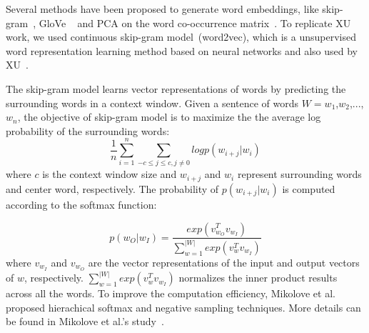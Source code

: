 \documentclass[sigconf]{acmart}
\theoremstyle{break}
\begin{document}
Several methods have been proposed to generate word embeddings, 
like skip-gram~\cite{mikolov2013distributed}, GloVe ~\cite{pennington2014glove}
and PCA on the word co-occurrence matrix~\cite{lebret2013word}. To replicate XU work,
we used continuous skip-gram model~(word2vec),  which is a unsupervised word representation learning method based on
neural networks and also used by  XU~\cite{xu2016predicting}. 

The skip-gram model learns vector representations of words
 by predicting the surrounding words in a context window. 
 Given a sentence of words $W =w_1$,$w_2$,...,$w_n$, the objective of skip-gram model is to maximize the
 the average log probability of the surrounding words:
 \begin{equation*}
 \frac{1}{n}\sum_{i=1}^{n} \sum_{-c\leq j \leq c, j \neq 0} log p(w_{i+j}|w_i)
\end{equation*}
where $c$ is the context window size and $w_{i+j}$ and $w_{i}$ represent surrounding words and center word, respectively.
The probability of $p(w_{i+j}|w_i)$ is computed according to the softmax function:

\begin{equation*}
p(w_O|w_I) = \frac{exp(v_{w_O}^Tv_{w_I})}{\sum_{w=1}^{|W|}exp(v_{w}^Tv_{w_I})}
\end{equation*}
where $v_{w_I}$ and $v_{w_O}$ are the vector representations of the input and output vectors of $w$, respectively. 
$\sum_{w=1}^{|W|}exp(v_{w}^Tv_{w_I})$  normalizes the inner product results across all the words.
To improve the computation efficiency, Mikolove et al. ~\cite{mikolov2013distributed} proposed
hierachical softmax and negative sampling
techniques. More details can be found in Mikolove et al.'s study~\cite{mikolov2013distributed}.
\end{document}
